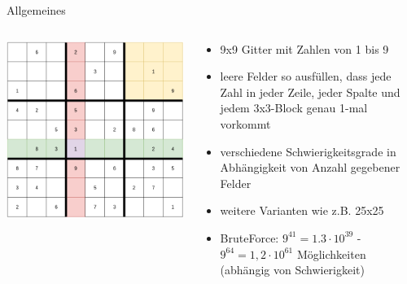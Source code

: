 \begin{frame}{Allgemeines}
    \begin{columns}[T] %
        \begin{column}{0.55\textwidth}
            \vspace*{0.2cm}
            \includegraphics[width=\textwidth]{Pictures/Leer.png}
        \end{column}
        \begin{column}{0.55\textwidth}
            \begin{itemize}
                \item 9x9 Gitter mit Zahlen von 1 bis 9
                \item leere Felder so ausfüllen, dass jede Zahl in
                jeder Zeile, jeder Spalte und jedem 3x3-Block genau 1-mal vorkommt
                \item verschiedene Schwierigkeitsgrade in Abhängigkeit von Anzahl 
                gegebener Felder
                \item weitere Varianten wie z.B. 25x25
                \item BruteForce: \(9^{41}=1.3\cdot 10^{39}\) - \(9^{64}=1,2\cdot 10^{61}\) Möglichkeiten (abhängig von Schwierigkeit)
            \end{itemize}
        \end{column}
    \end{columns}
\end{frame}